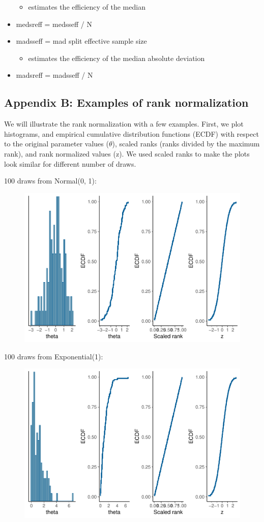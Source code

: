 \documentclass[american,]{article}
\providecommand{\tightlist}{%
  \setlength{\itemsep}{0pt}\setlength{\parskip}{0pt}}
\begin{document}
\begin{itemize}
  \begin{itemize}
  \tightlist
  \item
    estimates the efficiency of the median
  \end{itemize}
\item
  medsreff = medsseff / N
\item
  madsseff = mad split effective sample size

  \begin{itemize}
  \tightlist
  \item
    estimates the efficiency of the median absolute deviation
  \end{itemize}
\item
  madsreff = madsseff / N
\end{itemize}

\hypertarget{AppendixB}{%
\subsection*{Appendix B: Examples of rank
normalization}\label{AppendixB}}

We will illustrate the rank normalization with a few examples. First, we
plot histograms, and empirical cumulative distribution functions (ECDF)
with respect to the original parameter values (\(\theta\)), scaled ranks
(ranks divided by the maximum rank), and rank normalized values (z). We
used scaled ranks to make the plots look similar for different number of
draws.

100 draws from Normal(0, 1):

\begin{figure}[tp]
  \centering
  \includegraphics[width=0.6\linewidth]{graphics/ranknorm-normal-1.pdf}
\end{figure}

100 draws from Exponential(1):

\begin{figure}[tp]
  \centering
  \includegraphics[width=0.6\linewidth]{graphics/ranknorm-exp-1.pdf}
\end{figure}
\end{document}
